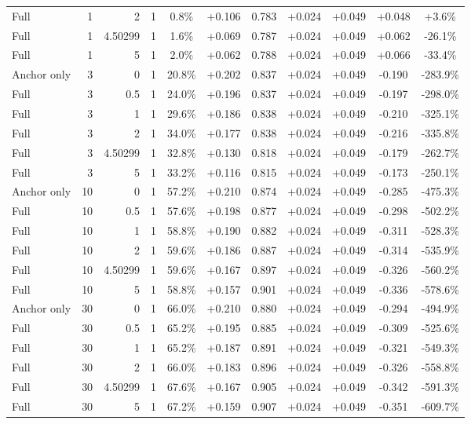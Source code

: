 \begin{table}[htbp]
\begin{tabular}{lrrrccccccc}
Full & 1 & 2 & 1 & 0.8\% & +0.106 & 0.783 & +0.024 & +0.049 & +0.048 & +3.6\% \\
Full & 1 & 4.50299 & 1 & 1.6\% & +0.069 & 0.787 & +0.024 & +0.049 & +0.062 & -26.1\% \\
Full & 1 & 5 & 1 & 2.0\% & +0.062 & 0.788 & +0.024 & +0.049 & +0.066 & -33.4\% \\
Anchor only & 3 & 0 & 1 & 20.8\% & +0.202 & 0.837 & +0.024 & +0.049 & -0.190 & -283.9\% \\
Full & 3 & 0.5 & 1 & 24.0\% & +0.196 & 0.837 & +0.024 & +0.049 & -0.197 & -298.0\% \\
Full & 3 & 1 & 1 & 29.6\% & +0.186 & 0.838 & +0.024 & +0.049 & -0.210 & -325.1\% \\
Full & 3 & 2 & 1 & 34.0\% & +0.177 & 0.838 & +0.024 & +0.049 & -0.216 & -335.8\% \\
Full & 3 & 4.50299 & 1 & 32.8\% & +0.130 & 0.818 & +0.024 & +0.049 & -0.179 & -262.7\% \\
Full & 3 & 5 & 1 & 33.2\% & +0.116 & 0.815 & +0.024 & +0.049 & -0.173 & -250.1\% \\
Anchor only & 10 & 0 & 1 & 57.2\% & +0.210 & 0.874 & +0.024 & +0.049 & -0.285 & -475.3\% \\
Full & 10 & 0.5 & 1 & 57.6\% & +0.198 & 0.877 & +0.024 & +0.049 & -0.298 & -502.2\% \\
Full & 10 & 1 & 1 & 58.8\% & +0.190 & 0.882 & +0.024 & +0.049 & -0.311 & -528.3\% \\
Full & 10 & 2 & 1 & 59.6\% & +0.186 & 0.887 & +0.024 & +0.049 & -0.314 & -535.9\% \\
Full & 10 & 4.50299 & 1 & 59.6\% & +0.167 & 0.897 & +0.024 & +0.049 & -0.326 & -560.2\% \\
Full & 10 & 5 & 1 & 58.8\% & +0.157 & 0.901 & +0.024 & +0.049 & -0.336 & -578.6\% \\
Anchor only & 30 & 0 & 1 & 66.0\% & +0.210 & 0.880 & +0.024 & +0.049 & -0.294 & -494.9\% \\
Full & 30 & 0.5 & 1 & 65.2\% & +0.195 & 0.885 & +0.024 & +0.049 & -0.309 & -525.6\% \\
Full & 30 & 1 & 1 & 65.2\% & +0.187 & 0.891 & +0.024 & +0.049 & -0.321 & -549.3\% \\
Full & 30 & 2 & 1 & 66.0\% & +0.183 & 0.896 & +0.024 & +0.049 & -0.326 & -558.8\% \\
Full & 30 & 4.50299 & 1 & 67.6\% & +0.167 & 0.905 & +0.024 & +0.049 & -0.342 & -591.3\% \\
Full & 30 & 5 & 1 & 67.2\% & +0.159 & 0.907 & +0.024 & +0.049 & -0.351 & -609.7\% \\

\end{tabular}
\end{table}
